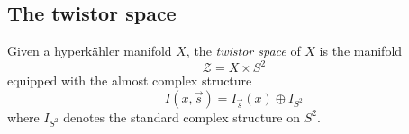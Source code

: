 \documentclass[12pt,letterpaper,reqno]{article}
\numberwithin{equation}{section}
\newcommand{\cZ}{\ensuremath{\mathcal Z}}
\newcommand{\cO}{\ensuremath{\mathcal O}}
\newcommand{\C}{\ensuremath{\mathbb C}}
\newcommand{\PP}{\ensuremath{\mathbb P}}
\newcommand{\hk}{hyperk\"ahler\xspace}
\newcommand{\ti}[1]{\textit{#1}}
\newcommand{\fixme}[1]{{\color{orange}{[#1]}}}
\begin{document}



\subsection{The twistor space}

\begin{defn} Given a \hk manifold $X$, the \ti{twistor space} of $X$ is the manifold
\begin{equation}
  \cZ = X \times S^2
\end{equation}
equipped with the almost complex structure
\begin{equation}
  I(x,\vec s) = I_{\vec s}(x) \oplus I_{S^2}
\end{equation}
where $I_{S^2}$ denotes the 
standard complex structure on $S^2$.
\end{defn}
\end{document}
